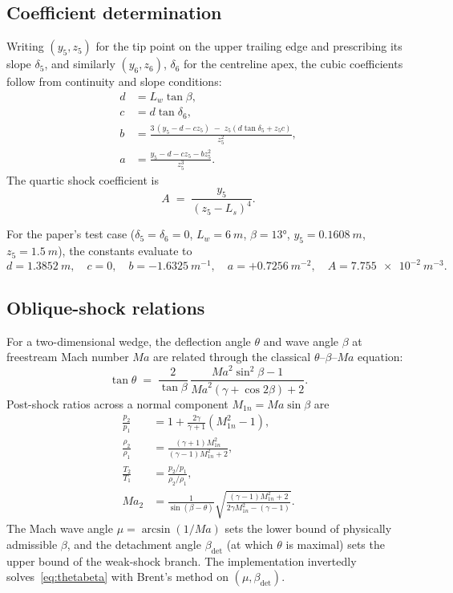 \documentclass[11pt,a4paper]{article}
\newcommand{\Ma}{\mathit{Ma}}
\newcommand{\Lw}{L_{w}}
\newcommand{\Ls}{L_{s}}
\begin{document}
\subsection{Coefficient determination}

Writing $(y_{5},z_{5})$ for the tip point on the upper trailing edge
and prescribing its slope $\delta_{5}$, and similarly $(y_{6},z_{6})$,
$\delta_{6}$ for the centreline apex, the cubic coefficients follow from
continuity and slope conditions:
\begin{align}
 d &= \Lw \tan\beta , \label{eq:d}\\
 c &= d \tan\delta_{6} , \label{eq:c}\\
 b &= \frac{3\,(y_{5} - d - c z_{5})
           \;-\; z_{5}(d\tan\delta_{5} + z_{5} c)}{z_{5}^{2}} , \label{eq:b}\\
 a &= \frac{y_{5} - d - c z_{5} - b z_{5}^{2}}{z_{5}^{3}} . \label{eq:a}
\end{align}
The quartic shock coefficient is
\begin{equation}
 A \;=\; \frac{y_{5}}{(z_{5}-\Ls)^{4}}. \label{eq:A}
\end{equation}

For the paper's test case ($\delta_{5}=\delta_{6}=0$, $\Lw=\SI{6}{m}$,
$\beta=\ang{13}$, $y_{5}=\SI{0.1608}{m}$, $z_{5}=\SI{1.5}{m}$), the
constants evaluate to
\[
 d = \SI{1.3852}{m}, \quad c = 0, \quad b = -\SI{1.6325}{m^{-1}},
 \quad a = +\SI{0.7256}{m^{-2}}, \quad A = \SI{7.755e-2}{m^{-3}}.
\]

\subsection{Oblique-shock relations}

For a two-dimensional wedge, the deflection angle $\theta$ and wave
angle $\beta$ at freestream Mach number $\Ma$ are related through the
classical $\theta$--$\beta$--$\Ma$ equation:
\begin{equation}
 \tan\theta \;=\; \frac{2}{\tan\beta}\,
 \frac{\Ma^{2}\sin^{2}\beta - 1}
      {\Ma^{2}(\gamma + \cos 2\beta) + 2}. \label{eq:thetabeta}
\end{equation}
Post-shock ratios across a normal component
$M_{1n}=\Ma\sin\beta$ are
\begin{align}
 \tfrac{p_{2}}{p_{1}} &= 1 + \tfrac{2\gamma}{\gamma+1}(M_{1n}^{2}-1),\\
 \tfrac{\rho_{2}}{\rho_{1}} &= \tfrac{(\gamma+1) M_{1n}^{2}}{(\gamma-1) M_{1n}^{2} + 2},\\
 \tfrac{T_{2}}{T_{1}} &= \tfrac{p_{2}/p_{1}}{\rho_{2}/\rho_{1}},\\
 \Ma_{2} &= \frac{1}{\sin(\beta-\theta)}
           \sqrt{\frac{(\gamma-1) M_{1n}^{2} + 2}
                      {2\gamma M_{1n}^{2} - (\gamma-1)}}.
\end{align}
The Mach wave angle $\mu=\arcsin(1/\Ma)$ sets the lower bound of
physically admissible $\beta$, and the detachment angle $\beta_{\det}$
(at which $\theta$ is maximal) sets the upper bound of the weak-shock
branch. The implementation invertedly solves~\eqref{eq:thetabeta} with
Brent's method on $(\mu,\beta_{\det})$.
\end{document}
